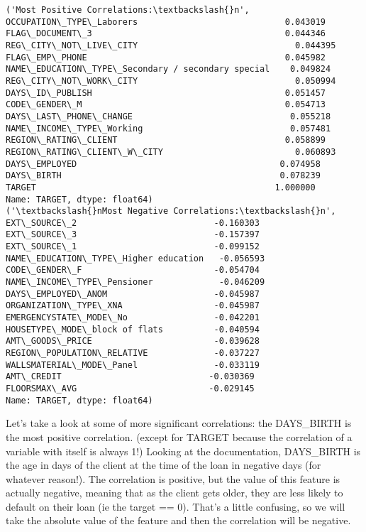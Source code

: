 \documentclass[11pt]{article}
\begin{document}
    \begin{Verbatim}[commandchars=\\\{\}]
('Most Positive Correlations:\textbackslash{}n', OCCUPATION\_TYPE\_Laborers                             0.043019
FLAG\_DOCUMENT\_3                                      0.044346
REG\_CITY\_NOT\_LIVE\_CITY                               0.044395
FLAG\_EMP\_PHONE                                       0.045982
NAME\_EDUCATION\_TYPE\_Secondary / secondary special    0.049824
REG\_CITY\_NOT\_WORK\_CITY                               0.050994
DAYS\_ID\_PUBLISH                                      0.051457
CODE\_GENDER\_M                                        0.054713
DAYS\_LAST\_PHONE\_CHANGE                               0.055218
NAME\_INCOME\_TYPE\_Working                             0.057481
REGION\_RATING\_CLIENT                                 0.058899
REGION\_RATING\_CLIENT\_W\_CITY                          0.060893
DAYS\_EMPLOYED                                        0.074958
DAYS\_BIRTH                                           0.078239
TARGET                                               1.000000
Name: TARGET, dtype: float64)
('\textbackslash{}nMost Negative Correlations:\textbackslash{}n', EXT\_SOURCE\_2                           -0.160303
EXT\_SOURCE\_3                           -0.157397
EXT\_SOURCE\_1                           -0.099152
NAME\_EDUCATION\_TYPE\_Higher education   -0.056593
CODE\_GENDER\_F                          -0.054704
NAME\_INCOME\_TYPE\_Pensioner             -0.046209
DAYS\_EMPLOYED\_ANOM                     -0.045987
ORGANIZATION\_TYPE\_XNA                  -0.045987
EMERGENCYSTATE\_MODE\_No                 -0.042201
HOUSETYPE\_MODE\_block of flats          -0.040594
AMT\_GOODS\_PRICE                        -0.039628
REGION\_POPULATION\_RELATIVE             -0.037227
WALLSMATERIAL\_MODE\_Panel               -0.033119
AMT\_CREDIT                             -0.030369
FLOORSMAX\_AVG                          -0.029145
Name: TARGET, dtype: float64)

    \end{Verbatim}

    Let's take a look at some of more significant correlations: the
DAYS\_BIRTH is the most positive correlation. (except for TARGET because
the correlation of a variable with itself is always 1!) Looking at the
documentation, DAYS\_BIRTH is the age in days of the client at the time
of the loan in negative days (for whatever reason!). The correlation is
positive, but the value of this feature is actually negative, meaning
that as the client gets older, they are less likely to default on their
loan (ie the target == 0). That's a little confusing, so we will take
the absolute value of the feature and then the correlation will be
negative.
\end{document}
